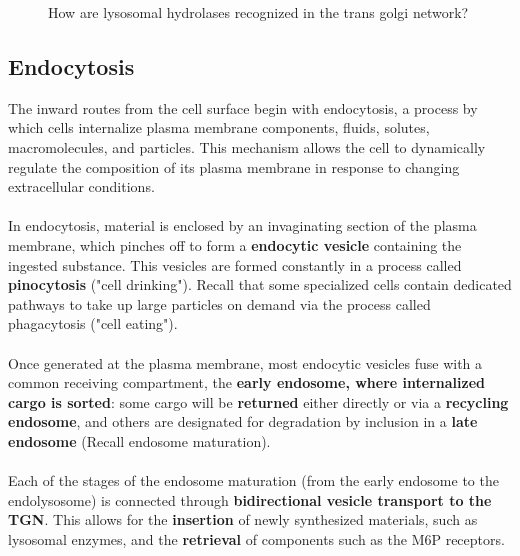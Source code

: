 \documentclass[../main.tex]{subfiles}
\begin{document}
\begin{figure}[H]
	\centering
	\caption{How are lysosomal hydrolases recognized in the trans golgi network?}
\end{figure}

\subsection{Endocytosis}
The inward routes from the cell surface begin with endocytosis, a process by which cells internalize plasma membrane components, fluids, solutes, macromolecules, and particles. This mechanism allows the cell to dynamically regulate the composition of its plasma membrane in response to changing extracellular conditions.\\
\\
In endocytosis, material is enclosed by an invaginating section of the plasma membrane, which pinches off to form a \textbf{endocytic vesicle} containing the ingested substance. This vesicles are formed constantly in a process called \textbf{\gls{pinocytosis}} ("cell drinking"). Recall that some specialized cells contain dedicated pathways to take up large particles on demand via the process called phagacytosis ("cell eating"). \\
\\
Once generated at the plasma membrane, most endocytic vesicles fuse with a common receiving compartment, the \textbf{early endosome, where internalized cargo is sorted}: some cargo will be \textbf{returned} either directly or via a \textbf{recycling endosome}, and others are designated for degradation by inclusion in a \textbf{late endosome} (Recall endosome maturation). \\
\\
Each of the stages of the endosome maturation (from the early endosome to the endolysosome) is connected through \textbf{bidirectional vesicle transport to the TGN}. This allows for the \textbf{insertion} of newly synthesized materials, such as lysosomal enzymes, and the \textbf{retrieval} of components such as the M6P receptors. 
\end{document}
